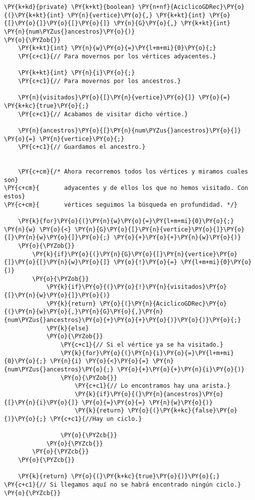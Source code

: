 \begin{Verbatim}[commandchars=\\\{\}]
\PY{k+kd}{private} \PY{k+kt}{boolean} \PY{n+nf}{AciclicoGDRec}\PY{o}{(}\PY{k+kt}{int} \PY{n}{vertice}\PY{o}{,} \PY{k+kt}{int} \PY{o}{[}\PY{o}{]}\PY{o}{[}\PY{o}{]} \PY{n}{G}\PY{o}{,} \PY{k+kt}{int} \PY{n}{num\PYZus{}ancestros}\PY{o}{)} 
\PY{o}{\PYZob{}}
    \PY{k+kt}{int} \PY{n}{w}\PY{o}{=}\PY{l+m+mi}{0}\PY{o}{;}
    \PY{c+c1}{// Para movernos por los vértices adyacentes.}

    \PY{k+kt}{int} \PY{n}{i}\PY{o}{;}
    \PY{c+c1}{// Para movernos por los ancestros.}

    \PY{n}{visitados}\PY{o}{[}\PY{n}{vertice}\PY{o}{]} \PY{o}{=} \PY{k+kc}{true}\PY{o}{;}
    \PY{c+c1}{// Acabamos de visitar dicho vértice.}

    \PY{n}{ancestros}\PY{o}{[}\PY{n}{num\PYZus{}ancestros}\PY{o}{]} \PY{o}{=} \PY{n}{vertice}\PY{o}{;}
    \PY{c+c1}{// Guardamos el ancestro.}
	

    \PY{c+cm}{/* Ahora recorremos todos los vértices y miramos cuales son}
\PY{c+cm}{       adyacentes y de ellos los que no hemos visitado. Con estos}
\PY{c+cm}{       vértices seguimos la búsqueda en profundidad. */}

    \PY{k}{for}\PY{o}{(}\PY{n}{w}\PY{o}{=}\PY{l+m+mi}{0}\PY{o}{;} \PY{n}{w} \PY{o}{<} \PY{n}{G}\PY{o}{[}\PY{n}{vertice}\PY{o}{]}\PY{o}{[}\PY{n}{w}\PY{o}{]}\PY{o}{;} \PY{o}{+}\PY{o}{+}\PY{n}{w}\PY{o}{)}
	\PY{o}{\PYZob{}}
	    \PY{k}{if}\PY{o}{(}\PY{n}{G}\PY{o}{[}\PY{n}{vertice}\PY{o}{]}\PY{o}{[}\PY{n}{w}\PY{o}{]} \PY{o}{!}\PY{o}{=} \PY{l+m+mi}{0}\PY{o}{)}
		\PY{o}{\PYZob{}}
		    \PY{k}{if}\PY{o}{(}\PY{o}{!}\PY{n}{visitados}\PY{o}{[}\PY{n}{w}\PY{o}{]}\PY{o}{)}
			\PY{k}{return} \PY{o}{(}\PY{n}{AciclicoGDRec}\PY{o}{(}\PY{n}{w}\PY{o}{,}\PY{n}{G}\PY{o}{,}\PY{n}{num\PYZus{}ancestros}\PY{o}{+}\PY{o}{+}\PY{o}{)}\PY{o}{)}\PY{o}{;}
		    \PY{k}{else}
			\PY{o}{\PYZob{}}
			    \PY{c+c1}{// Si el vértice ya se ha visitado.}
			    \PY{k}{for}\PY{o}{(}\PY{n}{i}\PY{o}{=}\PY{l+m+mi}{0}\PY{o}{;} \PY{n}{i} \PY{o}{<}\PY{o}{=} \PY{n}{num\PYZus{}ancestros}\PY{o}{;} \PY{o}{+}\PY{o}{+}\PY{n}{i}\PY{o}{)}
				\PY{o}{\PYZob{}}
				    \PY{c+c1}{// Lo encontramos hay una arista.}
				    \PY{k}{if}\PY{o}{(}\PY{n}{ancestros}\PY{o}{[}\PY{n}{i}\PY{o}{]} \PY{o}{=}\PY{o}{=} \PY{n}{w}\PY{o}{)}
					\PY{k}{return} \PY{o}{(}\PY{k+kc}{false}\PY{o}{)}\PY{o}{;} \PY{c+c1}{//Hay un ciclo.}
					
				\PY{o}{\PYZcb{}}
			\PY{o}{\PYZcb{}}
		\PY{o}{\PYZcb{}}
	\PY{o}{\PYZcb{}}
	
    \PY{k}{return} \PY{o}{(}\PY{k+kc}{true}\PY{o}{)}\PY{o}{;} \PY{c+c1}{// Si llegamos aquí no se habrá encontrado ningún ciclo.}
\PY{o}{\PYZcb{}}
\end{Verbatim}
